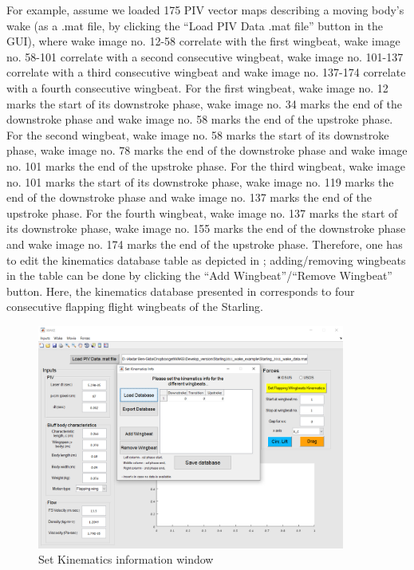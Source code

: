 \documentclass[12pt,a4paper]{article}
\begin{document}
For example, assume we loaded 175 PIV vector maps describing a moving body's wake (as a .mat file, by clicking the ``Load PIV Data .mat file'' button in the GUI), where wake image no. 12-58 correlate with the first wingbeat, wake image no. 58-101 correlate with a second consecutive wingbeat, wake image no. 101-137 correlate with a third consecutive wingbeat and wake image no. 137-174 correlate with a fourth consecutive wingbeat. For the first wingbeat, wake image no. 12 marks the start of its downstroke phase, wake image no. 34 marks the end of the downstroke phase and wake image no. 58 marks the end of the upstroke phase. For the second wingbeat, wake image no. 58 marks the start of its downstroke phase, wake image no. 78 marks the end of the downstroke phase and wake image no. 101 marks the end of the upstroke phase. For the third wingbeat, wake image no. 101 marks the start of its downstroke phase, wake image no. 119 marks the end of the downstroke phase and wake image no. 137 marks the end of the upstroke phase. For the fourth wingbeat, wake image no. 137 marks the start of its downstroke phase, wake image no. 155 marks the end of the downstroke phase and wake image no. 174 marks the end of the upstroke phase.
Therefore, one has to edit the kinematics database table as depicted in ; adding/removing wingbeats in the table can be done by clicking the ``Add Wingbeat''/``Remove Wingbeat'' button. 
Here, the kinematics database presented in  corresponds to four consecutive flapping flight wingbeats of the Starling. 

\begin{figure}[ht!]
	\centering
	\includegraphics[width=0.9\textwidth]{kinematics-database-window}
	\caption{Set Kinematics information window}
	\label{fig:GUI-kinematics-database-window}
\end{figure}
\end{document}
